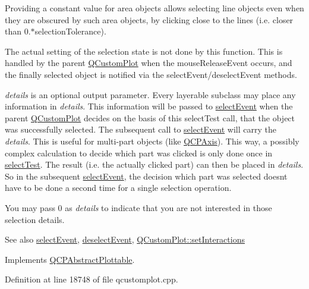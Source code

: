 Providing a constant value for area objects allows selecting line objects even when they are obscured by such area objects, by clicking close to the lines (i.\+e. closer than 0.$\ast$selection\+Tolerance).

The actual setting of the selection state is not done by this function. This is handled by the parent \hyperlink{class_q_custom_plot}{Q\+Custom\+Plot} when the mouse\+Release\+Event occurs, and the finally selected object is notified via the select\+Event/deselect\+Event methods.

{\itshape details} is an optional output parameter. Every layerable subclass may place any information in {\itshape details}. This information will be passed to \hyperlink{class_q_c_p_abstract_plottable_a16aaad02456aa23a759efd1ac90c79bf}{select\+Event} when the parent \hyperlink{class_q_custom_plot}{Q\+Custom\+Plot} decides on the basis of this select\+Test call, that the object was successfully selected. The subsequent call to \hyperlink{class_q_c_p_abstract_plottable_a16aaad02456aa23a759efd1ac90c79bf}{select\+Event} will carry the {\itshape details}. This is useful for multi-\/part objects (like \hyperlink{class_q_c_p_axis}{Q\+C\+P\+Axis}). This way, a possibly complex calculation to decide which part was clicked is only done once in \hyperlink{class_q_c_p_bars_a0d37a9feb1d0baf73ce6e809db214445}{select\+Test}. The result (i.\+e. the actually clicked part) can then be placed in {\itshape details}. So in the subsequent \hyperlink{class_q_c_p_abstract_plottable_a16aaad02456aa23a759efd1ac90c79bf}{select\+Event}, the decision which part was selected doesn\textquotesingle{}t have to be done a second time for a single selection operation.

You may pass 0 as {\itshape details} to indicate that you are not interested in those selection details.

\begin{DoxySeeAlso}{See also}
\hyperlink{class_q_c_p_abstract_plottable_a16aaad02456aa23a759efd1ac90c79bf}{select\+Event}, \hyperlink{class_q_c_p_abstract_plottable_a6fa0d0f95560ea8b01ee13f296dab2b1}{deselect\+Event}, \hyperlink{class_q_custom_plot_a5ee1e2f6ae27419deca53e75907c27e5}{Q\+Custom\+Plot\+::set\+Interactions} 
\end{DoxySeeAlso}


Implements \hyperlink{class_q_c_p_abstract_plottable_a38efe9641d972992a3d44204bc80ec1d}{Q\+C\+P\+Abstract\+Plottable}.



Definition at line 18748 of file qcustomplot.\+cpp.



